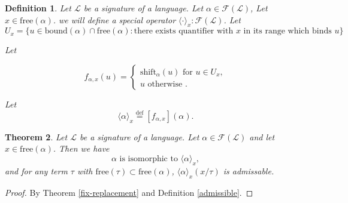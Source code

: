 \documentclass[10pt]{article}
\theoremstyle{plain}
\newtheorem{theorem}{Theorem}[section]
\newtheorem{definition}[theorem]{Definition}
\newcommand{\defeq}{\stackrel{\mathrm{def}}{=}}
\newcommand{\free}{\text{free}}
\newcommand{\bound}{\text{bound}}
\newcommand{\F}{\mathcal{F}}
\renewcommand{\L}{\mathscr{L}}
\newcommand{\shift}{\text{shift}}
\begin{document}
\begin{definition}
Let $\L$ be a signature of a language. 
Let $\alpha\in\F(\L)$, Let $x\in\free(\alpha)$.
we will define a special operator 
$\langle \cdot \rangle_x:\F(\L)$.
Let 
$$
U_x = \{u\in\bound(\alpha)\cap\free(\alpha): \text{there exists quantifier with $x$ in its range which binds $u$}\}
$$

Let 

\begin{equation}
f_{\alpha, x}(u) =
\begin{cases}
\shift_\alpha(u) \text{ for } u\in U_x,\\
u \text{ otherwise }.
\end{cases}
\end{equation}

Let
\begin{equation}
\langle \alpha \rangle_x \defeq [f_{\alpha, x}](\alpha).
\end{equation}

\end{definition}

\begin{theorem}
Let $\L$ be a signature of a language. 
Let $\alpha\in\F(\L)$ and let $x\in\free(\alpha)$.
Then we have
\begin{equation}
\alpha \text{ is isomorphic to } \langle \alpha \rangle_x,
\end{equation}
and for any term $\tau$ with $\free(\tau) \subset \free(\alpha)$, $\langle \alpha \rangle_x (x/\tau)$ is admissable.
\end{theorem}
\begin{proof}
By Theorem \ref{fix-replacement} and Definition \ref{admissible}.
\end{proof}




\end{document}
